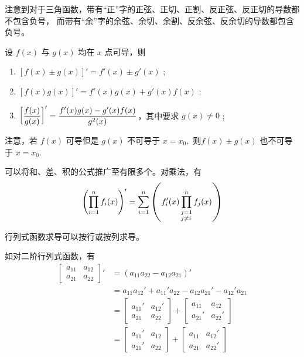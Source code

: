 注意到对于三角函数，带有“正”字的正弦、正切、正割、反正弦、反正切的导数都不包含负号，
而带有“余”字的余弦、余切、余割、反余弦、反余切的导数都包含负号。

\begin{Field}[导数的四则运算法则]

    设 $ f(x) $ 与 $ g(x) $ 均在 $ x $ 点可导，则
    \begin{enumerate}
        \item $ \left[f(x)\pm g(x)\right]'=f'(x)\pm g'(x) $ ;
        \item $ \left[f(x)g(x)\right]'=f'(x)g(x)+g'(x)f(x) $ ;
        \item $\displaystyle \left[\frac{f(x)}{g(x)}\right]'=\frac{f'(x)g(x)-g'(x)f(x)}{g^2(x)}$，其中要求 $ g(x)\neq 0 $  ;
    \end{enumerate}
\end{Field}

注意，若 $ f(x) $ 可导但是 $ g(x) $ 不可导于 $ x=x_0, $ 则$ f(x)\pm g(x) $ 也不可导于 $ x=x_0. $ 

可以将和、差、积的公式推广至有限多个。对乘法，有
$$
    \left(\prod_{i=1}^nf_i(x)\right)'=\sum_{i=1}^n\left(f'_i(x)\prod_{\begin{subarray}{align}j=1\\j\neq i\end{subarray}}^n f_j(x)\right)
$$ 

\begin{Field}[行列式函数求导]

    行列式函数求导可以按行或按列求导。
    
    如对二阶行列式函数，有
    \begin{equation*}
        \begin{aligned}
            \left[\begin{matrix}
                a_{11}&a_{12}\\a_{21}&a_{22}
            \end{matrix}\right]'&=(a_{11}a_{22}-a_{12}a_{21})'\\
            &=a_{11}a_{12}'+a_{11}'a_{22}-a_{12}a_{21}'-a_{12}'a_{21}\\ 
            &=\begin{bmatrix}
                a_{11}'&a_{12}'\\a_{21}&a_{22}
            \end{bmatrix}+
            \begin{bmatrix}
                a_{11}&a_{12}\\a_{21}'&a_{22}'
            \end{bmatrix}\\
            &=\begin{bmatrix}
                a_{11}'&a_{12}\\a_{21}'&a_{22}
            \end{bmatrix}+
            \begin{bmatrix}
                a_{11}&a_{12}'\\a_{21}&a_{22}'
            \end{bmatrix}\\
        \end{aligned}
    \end{equation*}
\end{Field}


